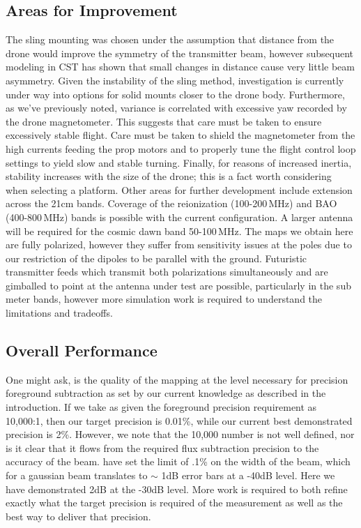 \documentclass[preprint2,numberedappendix,tighten,twocolappendix]{aastex6}
\begin{document}
\subsection{Areas for Improvement}
The sling mounting was chosen under the assumption that distance from the drone would improve the symmetry of the transmitter beam, however subsequent modeling in CST has shown that small changes in distance cause very little beam asymmetry.  Given the instability of the sling method, investigation is currently under way into options for solid mounts closer to the drone body.  Furthermore, as we've previously noted, variance is correlated with excessive yaw recorded by the drone magnetometer.   This suggests that care must be taken to ensure excessively stable flight. Care must be taken to shield the magnetometer from the high currents feeding the prop motors and to properly tune the flight control loop settings to yield slow and stable turning.   Finally, for reasons of increased inertia, stability increases with the size of the drone; this is a fact worth considering when selecting a platform.
Other areas for further development include extension across the 21cm bands. Coverage of the reionization (100-200\,MHz) and BAO (400-800\,MHz) bands is possible with the current configuration. A larger antenna will be required for the cosmic dawn band 50-100\,MHz.  The maps we obtain here are fully polarized, however they suffer from sensitivity issues at the poles due to our restriction of the dipoles to be parallel with the ground. Futuristic transmitter feeds which transmit both polarizations simultaneously and are gimballed to point at the antenna under test are possible, particularly in the sub meter bands, however more simulation work is required to understand the limitations and tradeoffs.

\subsection{Overall Performance}
One might ask, is the quality of the mapping at the level necessary for precision foreground subtraction as set by our current knowledge as described in the introduction.   If we take as given the foreground precision requirement as 10,000:1, then our target precision is 0.01\%, while our current best demonstrated precision is 2\%.  However, we note that the 10,000 number is not well defined, nor is it clear that it flows from the required flux subtraction precision to the accuracy of the beam. \citet{Shaw2015_chimemmodes} have set the limit of .1\% on the width of the beam, which for a gaussian beam translates to $\sim$ 1dB error bars at a -40dB level. Here we have demonstrated 2dB at the -30dB level.  More work is required to both refine exactly what the target precision is required of the measurement as well as the best way to deliver that precision.
\end{document}
